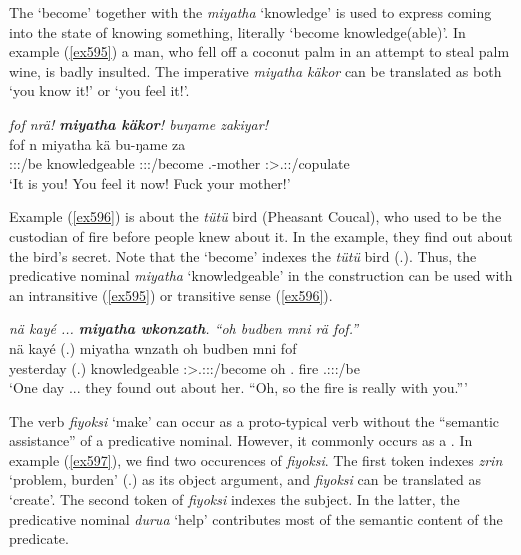 The  `become' together with the  \emph{miyatha} `knowledge' is used to express coming into the state of knowing something, literally `become knowledge(able)'. In example (\ref{ex595}) a man, who fell off a coconut palm in an attempt to steal palm wine, is badly insulted. The imperative \emph{miyatha käkor} can be translated as both `you know it!' or `you feel it!'.

\begin{exe}
	\ex \emph{fof nrä! \textbf{miyatha käkor}! buŋame zakiyar!}\\
	\gll fof n miyatha kä bu-ŋame za\\
	{\Emph} \Ssg:\Sbj:\Nonpast:\Ipfv/be knowledgeable \Ssg:\Sbj:\Imp:\Pfv/become \Ssg.\Poss-mother \Ssg:\Sbj>\Tsg.\F:\Imp:\Pfv/copulate\\
	\trans `It is you! You feel it now! Fuck your mother!'
	\label{ex595}
\end{exe}

Example (\ref{ex596}) is about the \emph{tütü} bird (Pheasant Coucal), who used to be the custodian of fire before people knew about it. In the example, they find out about the bird's secret. Note that the  `become' indexes the \emph{tütü} bird (\Tsg.\F). Thus, the predicative nominal \emph{miyatha} `knowledgeable' in the  construction can be used with an intransitive (\ref{ex595}) or transitive sense (\ref{ex596}).

\begin{exe}
	\ex \emph{nä kayé ... \textbf{miyatha wkonzath}. ``oh budben mni rä fof.''}\\
	\gll nä kayé (.) miyatha wnzath oh budben mni  fof\\
	{\Indf} yesterday (.) knowledgeable \Stpl:\Sbj>\Tsg.\F:\Obj:\Pst:\Ipfv/become oh \Ssg.{\Loc} fire \Tsg.\F:\Sbj:\Nonpast:\Ipfv/be {\Emph}\\
	\trans `One day ... they found out about her. ``Oh, so the fire is really with you.'''\\
	\label{ex596}
\end{exe}

The verb \emph{fiyoksi} `make' can occur as a proto-typical  verb without the ``semantic assistance'' of a predicative nominal. However, it commonly occurs as a . In example (\ref{ex597}), we find two occurences of \emph{fiyoksi}. The first token indexes \emph{zrin} `problem, burden' (\Tsg.\F) as its object argument, and \emph{fiyoksi} can be translated as `create'. The second token of \emph{fiyoksi} indexes the subject. In the latter, the predicative nominal \emph{durua} `help' contributes most of the semantic content of the predicate.

